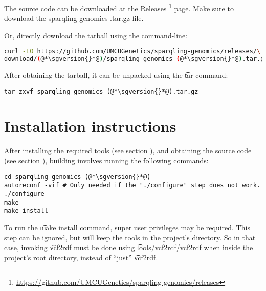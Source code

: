   \begin{sloppypar}
  The source code can be downloaded at the
  \href{https://github.com/UMCUGenetics/sparqling-genomics/releases}%
  {Releases}%
  \footnote{\url{https://github.com/UMCUGenetics/sparqling-genomics/releases}}
  page.  Make sure to download the {\fontfamily{\ttdefault}\selectfont
    sparqling-genomics-\sgversion{}.tar.gz} file.
  \end{sloppypar}

  Or, directly download the tarball using the command-line:
\begin{siderules}
\begin{lstlisting}[language=bash]
curl -LO https://github.com/UMCUGenetics/sparqling-genomics/releases/\
download/(@*\sgversion{}*@)/sparqling-genomics-(@*\sgversion{}*@).tar.gz
\end{lstlisting}
\end{siderules}

  After obtaining the tarball, it can be unpacked using the \t{tar}
  command:

\begin{siderules}
\begin{lstlisting}
tar zxvf sparqling-genomics-(@*\sgversion{}*@).tar.gz
\end{lstlisting}
\end{siderules}

\section{Installation instructions}

  After installing the required tools (see section ),
  and obtaining the source code (see section \refer{sec:obtaining-tarball}),
  building involves running the following commands:

\begin{siderules}
\begin{lstlisting}
cd sparqling-genomics-(@*\sgversion{}*@)
autoreconf -vif # Only needed if the "./configure" step does not work.
./configure
make
make install
\end{lstlisting}
\end{siderules}

  To run the \t{make install} command, super user privileges may be
  required.  This step can be ignored, but will keep the tools in the project's
  directory.  So in that case, invoking \t{vcf2rdf} must be done using
  \t{tools/vcf2rdf/vcf2rdf} when inside the project's root directory,
  instead of ``just'' \t{vcf2rdf}.

